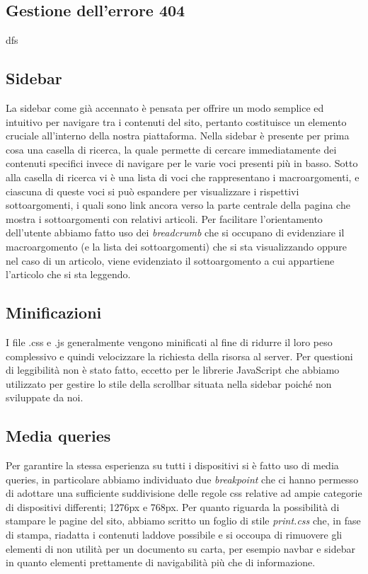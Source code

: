 \documentclass[12pt]{article}
\begin{document}
	\subsection{Gestione dell'errore 404}
	dfs

	\subsection{Sidebar}
	La sidebar come già accennato è pensata per offrire un modo semplice ed intuitivo per navigare tra i contenuti del sito, pertanto costituisce un elemento cruciale all'interno della nostra piattaforma. Nella sidebar è presente per prima cosa una casella di ricerca, la quale permette di cercare immediatamente dei contenuti specifici invece di navigare per le varie voci presenti più in basso. Sotto alla casella di ricerca vi è una lista di voci che rappresentano i macroargomenti, e ciascuna di queste voci si può espandere per visualizzare i rispettivi sottoargomenti, i quali sono link ancora verso la parte centrale della pagina che mostra i sottoargomenti con relativi articoli. Per facilitare l'orientamento dell'utente abbiamo fatto uso dei \emph{breadcrumb} che si occupano di evidenziare il macroargomento (e la lista dei sottoargomenti) che si sta visualizzando oppure nel caso di un articolo, viene evidenziato il sottoargomento a cui appartiene l'articolo che si sta leggendo.
		
	\subsection{Minificazioni}
	I file .css e .js generalmente vengono minificati al fine di ridurre il loro peso complessivo e quindi velocizzare la richiesta della risorsa al server. Per questioni di leggibilità non è stato fatto, eccetto per le librerie JavaScript che abbiamo utilizzato per gestire lo stile della scrollbar situata nella sidebar poiché non sviluppate da noi.
	
	\subsection{Media queries}
	Per garantire la stessa esperienza su tutti i dispositivi si è fatto uso di media queries, in particolare abbiamo individuato due \emph{breakpoint} che ci hanno permesso di adottare una sufficiente suddivisione delle regole css relative ad ampie categorie di dispositivi differenti; 1276px e 768px.
	Per quanto riguarda la possibilità di stampare le pagine del sito, abbiamo scritto un foglio di stile \emph{print.css} che, in fase di stampa, riadatta i contenuti laddove possibile e si occoupa di rimuovere gli elementi di non utilità per un documento su carta, per esempio navbar e sidebar in quanto elementi prettamente di navigabilità più che di informazione.
\end{document}
